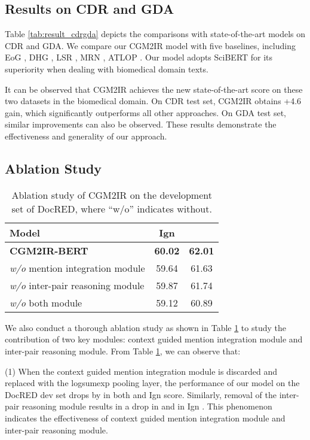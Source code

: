 \documentclass[11pt]{article}
\begin{document}
\subsection{Results on CDR and GDA}
Table \ref*{tab:result_cdrgda} depicts the comparisons with state-of-the-art models on CDR and GDA.
We compare our CGM2IR model with five baselines, including EoG \citep{christopoulou-etal-2019-connecting}, DHG \citep{zhang-etal-2020-document}, LSR \citep{nan-etal-2020-reasoning}, MRN \citep{li-etal-2021-mrn}, ATLOP \citep{DBLP:conf/aaai/Zhou0M021}.
Our model adopts SciBERT for its superiority when dealing with biomedical domain texts.

It can be observed that CGM2IR achieves the new state-of-the-art  score on these two datasets in the biomedical domain.
On CDR test set, CGM2IR obtains +4.6  gain, which significantly outperforms all other approaches. 
On GDA test set, similar improvements can also be observed. 
These results demonstrate the effectiveness and generality of our approach.
\subsection{Ablation Study}
\begin{table}[t]
	\centering
	\small
	\begin{tabular}{lcc}
		\toprule
		
		Model & Ign   &    	\\ \midrule 
		\textbf{CGM2IR-BERT}  & \textbf{60.02}  & \textbf{62.01}  \\ \midrule
		\textit{w/o} mention integration module & 59.64 & 61.63   \\ 
		\textit{w/o} inter-pair reasoning module  & 59.87 & 61.74  \\  
		\textit{w/o} both module & 59.12 & 60.89  \\ \bottomrule
		
		
	\end{tabular}
	\caption{Ablation study of CGM2IR on the development set of DocRED, where ``w/o'' indicates without.}
	\label{tab:result_ablation}
\end{table}

We also conduct a thorough ablation study as shown in Table \ref{tab:result_ablation} to study the contribution of two key modules: context guided mention integration module and inter-pair reasoning module.
From Table \ref{tab:result_ablation}, we can observe that:

(1) When the context guided mention integration module is discarded and replaced with the logsumexp pooling layer, the performance of our model on the DocRED dev set drops by  in both  and Ign  score.
Similarly, removal of the inter-pair reasoning module results in a  drop in  and  in Ign .
This phenomenon indicates the effectiveness of context guided mention integration module and inter-pair reasoning module.
\end{document}
